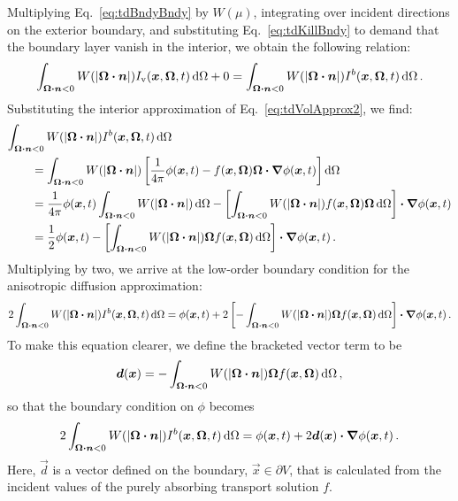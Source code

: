 Multiplying Eq.~\eqref{eq:tdBndyBndy} by $W(\mu)$, integrating over incident
directions on the exterior boundary, and substituting
Eq.~\eqref{eq:tdKillBndy} to demand that the boundary layer vanish in the
interior, we obtain
the following relation:
\begin{equation*}
  \int_{\bm{\Omega}\bm{\cdot}\bm{n} < 0}
  W(\left| \bm{\Omega}\bm{\cdot}\bm{n} \right|)
I_\mathrm{v}(\bm{x},\bm{\Omega},t) \mathop{}\!\mathrm{d}\Omega
+ 0
= 
  \int_{\bm{\Omega}\bm{\cdot}\bm{n} < 0}
  W(\left| \bm{\Omega}\bm{\cdot}\bm{n} \right|)
I^b(\bm{x},\bm{\Omega},t) \mathop{}\!\mathrm{d}\Omega \,.
\end{equation*}
Substituting the interior approximation of Eq.~\eqref{eq:tdVolApprox2}, we find:
\begin{align*} \nonumber
\lefteqn{\int_{\vec{\Omega}\vd\vec{n} < 0} W(\abs{\vec{\Omega}\vd\vec{n}})
I^b(\vec{x},\vec{\Omega},t) \ud\Omega}
\qquad&
\\ \nonumber
&= 
\int_{\vec{\Omega}\vd\vec{n} < 0}
W(\abs{\vec{\Omega}\vd\vec{n}})
\left[  \frac{1}{4\pi} \phi (\vec{x},t)
  - f(\vec{x}, \vec{\Omega})\vec{\Omega}\vd \grad \phi(\vec{x},t)
\right] \ud \Omega
\\ \nonumber
&=
\frac{1}{4\pi} \phi(\vec{x},t)
\int_{\vec{\Omega}\vd\vec{n} < 0} W(\abs{\vec{\Omega}\vd\vec{n}}) \ud\Omega
- \left[ \int_{\vec{\Omega}\vd\vec{n} < 0}  W(\abs{\vec{\Omega}\vd\vec{n}})
f(\vec{x}, \vec{\Omega})\vec{\Omega} \ud\Omega\right] \vd \grad \phi(\vec{x},t)
\\
&= \frac{1}{2} \phi(\vec{x},t)
- \left[ \int_{\vec{\Omega}\vd\vec{n} < 0} W(\abs{\vec{\Omega}\vd\vec{n}})
\vec{\Omega} f(\vec{x}, \vec{\Omega}) \ud\Omega\right] \vd \grad \phi(\vec{x},t)\,.
\end{align*}
Multiplying by two, we arrive at the low-order boundary condition for the
anisotropic diffusion approximation:
\begin{equation*}
2\int_{\bm{\Omega}\bm{\cdot}\bm{n} < 0} W(\left| \bm{\Omega}\bm{\cdot}\bm{n} \right|)
I^b(\bm{x},\bm{\Omega},t) \mathop{}\!\mathrm{d}\Omega
=
\phi(\bm{x},t)
+ 2 \left[ -\int_{\bm{\Omega}\bm{\cdot}\bm{n} < 0} W(\left| \bm{\Omega}\bm{\cdot}\bm{n} \right|)
\bm{\Omega} f(\bm{x}, \bm{\Omega}) \mathop{}\!\mathrm{d}\Omega\right] \bm{\cdot} \bm{\nabla} \phi(\bm{x},t)\,.
\end{equation*}
To make this equation clearer, we define the bracketed vector term to be
\begin{equation}\label{eq:adBoundaryIntegral}
  \bm{d}(\bm{x}) = -\int_{\bm{\Omega}\bm{\cdot}\bm{n} < 0} W(\left| \bm{\Omega}\bm{\cdot}\bm{n} \right|)
\bm{\Omega} f(\bm{x}, \bm{\Omega}) \mathop{}\!\mathrm{d}\Omega\,,
\end{equation}
so that the boundary condition on $\phi$ becomes
\begin{equation} \label{eq:loBc}
2\int_{\bm{\Omega}\bm{\cdot}\bm{n} < 0} W(\left| \bm{\Omega}\bm{\cdot}\bm{n} \right|)
I^b(\bm{x},\bm{\Omega},t) \mathop{}\!\mathrm{d}\Omega
=
\phi(\bm{x},t)
+ 2 \bm{d}(\bm{x}) \bm{\cdot} \bm{\nabla} \phi(\bm{x},t)\,.
\end{equation}
Here, $\vec{d}$ is a vector defined on the boundary, $\vec{x} \in \partial V$,
that is calculated from the incident values of the purely absorbing
transport solution $f$.

